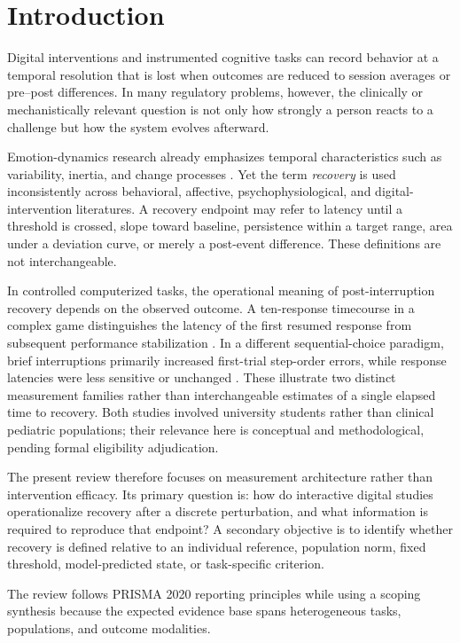 \section{Introduction}

Digital interventions and instrumented cognitive tasks can record behavior at a temporal resolution that is lost when outcomes are reduced to session averages or pre--post differences. In many regulatory problems, however, the clinically or mechanistically relevant question is not only how strongly a person reacts to a challenge but how the system evolves afterward.

Emotion-dynamics research already emphasizes temporal characteristics such as variability, inertia, and change processes \parencite{reitsema2022emotiondynamics}. Yet the term \emph{recovery} is used inconsistently across behavioral, affective, psychophysiological, and digital-intervention literatures. A recovery endpoint may refer to latency until a threshold is crossed, slope toward baseline, persistence within a target range, area under a deviation curve, or merely a post-event difference. These definitions are not interchangeable.

In controlled computerized tasks, the operational meaning of post-interruption recovery depends on the observed outcome. A ten-response timecourse in a complex game distinguishes the latency of the first resumed response from subsequent performance stabilization \parencite{altmann2007timecourse}. In a different sequential-choice paradigm, brief interruptions primarily increased first-trial step-order errors, while response latencies were less sensitive or unchanged \parencite{altmann2014momentary}. These illustrate two distinct measurement families rather than interchangeable estimates of a single elapsed time to recovery. Both studies involved university students rather than clinical pediatric populations; their relevance here is conceptual and methodological, pending formal eligibility adjudication.

The present review therefore focuses on measurement architecture rather than intervention efficacy. Its primary question is: how do interactive digital studies operationalize recovery after a discrete perturbation, and what information is required to reproduce that endpoint? A secondary objective is to identify whether recovery is defined relative to an individual reference, population norm, fixed threshold, model-predicted state, or task-specific criterion.

The review follows PRISMA 2020 reporting principles \parencite{page2021prisma} while using a scoping synthesis because the expected evidence base spans heterogeneous tasks, populations, and outcome modalities.
